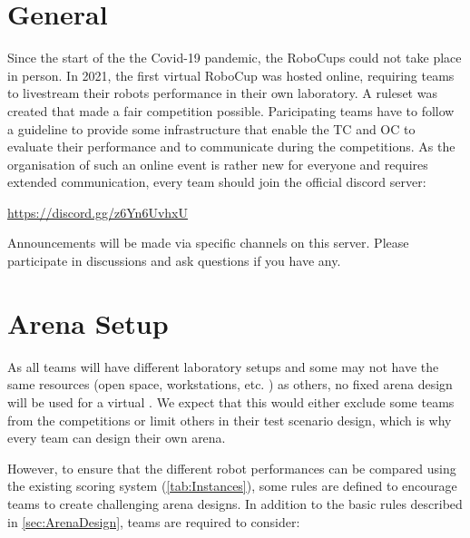
\section{General} 
\label{sec:VRCGeneral}

Since the start of the the Covid-19 pandemic, the RoboCups could not take place in person.
In 2021, the first virtual RoboCup was hosted online, requiring teams to livestream their robots performance in their own laboratory.
A ruleset was created that made a fair competition possible.
Paricipating teams have to follow a guideline to provide some infrastructure that enable the TC and OC to evaluate their performance and to communicate during the competitions.
As the organisation of such an online event is rather new for everyone and requires extended communication, 
every team should join the official \RCAW discord server:

\href{Official Discord Server}{https://discord.gg/z6Yn6UvhxU}

Announcements will be made via specific channels on this server.
Please participate in discussions and ask questions if you have any.

\section{Arena Setup} 
\label{sec:VRCArenaSetup}

As all teams will have different laboratory setups and some may not have the same resources (open space, workstations, etc. ) as others, no fixed arena design will be used for a virtual \RCAW. We expect that this would either exclude some teams from the competitions or limit others in their test scenario design, which is why every team can design their own arena.

However, to ensure that the different robot performances can be compared using the existing scoring system (\ref{tab:Instances}), some rules are defined to encourage teams to create challenging arena designs. In addition to the basic rules described in \ref{sec:ArenaDesign}, teams are required to consider: 
  
